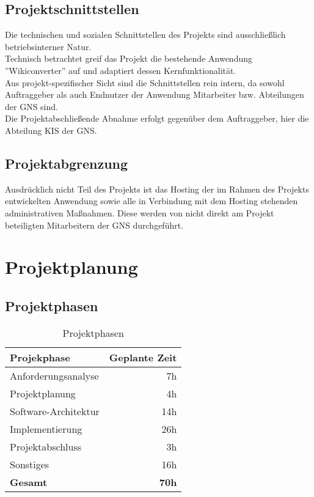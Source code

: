 \documentclass[12pt, xcolor=dvipsnames]{scrartcl}
\begin{document}
\subsection{Projektschnittstellen}

Die technischen und sozialen Schnittstellen des Projekts sind ausschließlich betriebsinterner Natur. \\
Technisch betrachtet greif das Projekt die bestehende Anwendung ''Wikiconverter'' auf und adaptiert dessen Kernfunktionalität. \\
Aus projekt-spezifischer Sicht sind die Schnittstellen rein intern, da sowohl Auftraggeber als auch Endnutzer der Anwendung Mitarbeiter bzw. Abteilungen der GNS sind. \\
Die Projektabschließende Abnahme erfolgt gegenüber dem Auftraggeber, hier die Abteilung KIS der GNS.


\subsection{Projektabgrenzung}

Ausdrücklich nicht Teil des Projekts ist das Hosting der im Rahmen des Projekts entwickelten Anwendung sowie alle in Verbindung mit dem Hosting stehenden administrativen Maßnahmen. Diese werden von nicht direkt am Projekt beteiligten Mitarbeitern der GNS durchgeführt.


\section{Projektplanung}

\subsection{Projektphasen}

	\begin{table}[H]
	\centering
	\begin{tabular}{lr}

		\rowcolor{MidnightBlue!15}				
		\textbf{Projekphase} & \textbf{Geplante Zeit} \\\hline
		
	    Anforderungsanalyse & 7h \\	   	   
	    Projektplanung & 4h \\	   			
	    Software-Architektur & 14h \\	 				
	    Implementierung & 26h \\	   				
	    Projektabschluss & 3h \\	   				
	    Sonstiges & 16h \\\hline
	  		
		\rowcolor{MidnightBlue!15}				
		\textbf{Gesamt} & \textbf{70h}				
			    
	\end{tabular}
	\caption{Projektphasen}
	\label{tab:projektphasen}
	\end{table}
	
\end{document}
